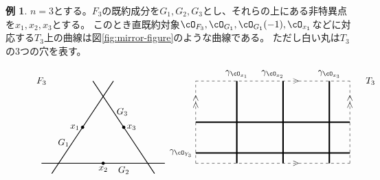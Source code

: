 \documentclass[a4j,uplatex,dvipdfmx]{jsarticle}
\numberwithin{equation}{section}
\numberwithin{figure}{section}
\theoremstyle{definition}
\newtheorem{example}[theorem]{例}
\begin{document}
\begin{example}\label{correspondence_of_objects}
    $n=3$とする。$F_3$の既約成分を$G_1, G_2, G_3$とし、それらの上にある非特異点を$x_1, x_2, x_3$とする。
    このとき直既約対象$\cO_{F_3}, \cO_{G_1}, \cO_{G_1}(-1), \cO_{x_1}$などに対応する$T_3$上の曲線は図\ref{fig:mirror-figure}のような曲線である。
    ただし白い丸は$T_3$の$3$つの穴を表す。
    \begin{figure}[h]
        \centering
        \begin{displaymath}
            \begin{tikzpicture}[scale = 0.4]
                \draw(-10, 8) node{$F_3$};
                \draw[thick] (-9,-1)--(-3,8);
                \draw[thick] (-10,0)--(2,0);
                \draw[thick] (1,-1)--(-5,8);

                \filldraw[black] (-6, 3.5) circle (4pt);
                \filldraw[black] (-4, 0) circle (4pt);
                \filldraw[black] (-2, 3.5) circle (4pt);

                \draw(-6, 3.5) node[left]{$x_1$};
                \draw(-4, 0) node[below]{$x_2$};
                \draw(-2, 3.5) node[right]{$x_3$};

                \draw(-7, 2) node[left]{$G_1$};
                \draw(-2, 0) node[below]{$G_2$};
                \draw(-3, 5) node[right]{$G_3$};

                \draw(22, 8) node{$T_3$};
                \draw[dashed] (5,0)--(20,0);
                \draw(14.75, 0) node{$>$};
                \draw[dashed] (5,0)--(5,8);
                \draw(5, 6) node{\rotatebox{90}{$>>$}};
                \draw[dashed] (5,8)--(20,8);
                \draw(14.75, 8) node{$>$};
                \draw[dashed] (20,0)--(20,8);
                \draw(20, 6) node{\rotatebox{90}{$>>$}};

                \draw[ultra thick] (5, 1)--(20, 1);
                \draw[ultra thick] (5, 4)--(20, 4);
                \draw(5, 1) node[left]{$\gamma_{\cO_{Y_3}}$};

                \draw[ultra thick] (8+1, 0)--(8+1, 8);
                \draw(8+1, 8) node[above]{$\gamma_{\cO_{x_1}}$};
                \draw[ultra thick] (12.5+1, 0)--(12.5+1, 8);
                \draw(12.5, 8) node[above]{$\gamma_{\cO_{x_2}}$};
                \draw[ultra thick] (17+1, 0)--(17+1, 8);
                \draw(17+1, 8) node[above]{$\gamma_{\cO_{x_3}}$};


\end{tikzpicture}
\end{displaymath}
\end{figure}
\end{example}
\end{document}
